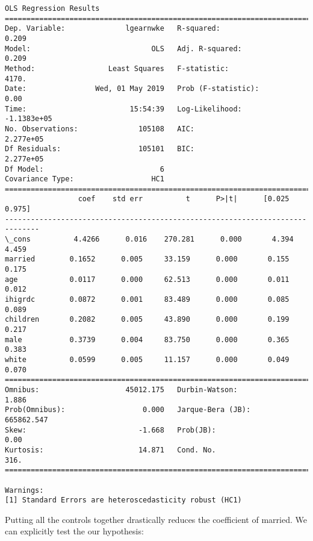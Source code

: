 \documentclass[11pt]{article}
\begin{document}
    \begin{Verbatim}[commandchars=\\\{\}]
                            OLS Regression Results                            
==============================================================================
Dep. Variable:              lgearnwke   R-squared:                       0.209
Model:                            OLS   Adj. R-squared:                  0.209
Method:                 Least Squares   F-statistic:                     4170.
Date:                Wed, 01 May 2019   Prob (F-statistic):               0.00
Time:                        15:54:39   Log-Likelihood:            -1.1383e+05
No. Observations:              105108   AIC:                         2.277e+05
Df Residuals:                  105101   BIC:                         2.277e+05
Df Model:                           6                                         
Covariance Type:                  HC1                                         
==============================================================================
                 coef    std err          t      P>|t|      [0.025      0.975]
------------------------------------------------------------------------------
\_cons          4.4266      0.016    270.281      0.000       4.394       4.459
married        0.1652      0.005     33.159      0.000       0.155       0.175
age            0.0117      0.000     62.513      0.000       0.011       0.012
ihigrdc        0.0872      0.001     83.489      0.000       0.085       0.089
children       0.2082      0.005     43.890      0.000       0.199       0.217
male           0.3739      0.004     83.750      0.000       0.365       0.383
white          0.0599      0.005     11.157      0.000       0.049       0.070
==============================================================================
Omnibus:                    45012.175   Durbin-Watson:                   1.886
Prob(Omnibus):                  0.000   Jarque-Bera (JB):           665862.547
Skew:                          -1.668   Prob(JB):                         0.00
Kurtosis:                      14.871   Cond. No.                         316.
==============================================================================

Warnings:
[1] Standard Errors are heteroscedasticity robust (HC1)

    \end{Verbatim}

    Putting all the controls together drastically reduces the coefficient of
married. We can explicitly test the our hypothesis:
\end{document}
